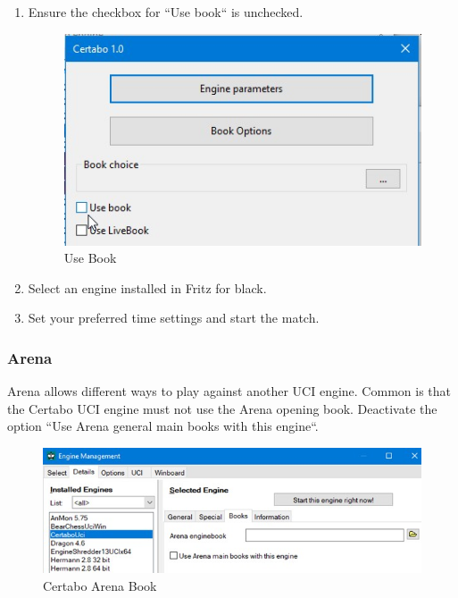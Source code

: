 \documentclass[11pt,a4paper]{article}
\begin{document}
\begin{enumerate}
	\item Ensure the checkbox for ``Use book`` is unchecked.
		\begin{figure}[H]
		\centering
		\includegraphics[scale=0.6]{fritz_engineusebook.jpg}
		\caption{Use Book}
		\label{fig:FritzUseBook}
	\end{figure}
	\item Select an engine installed in Fritz for black.
	\item Set your preferred time settings and start the match.	
\end{enumerate}

\subsubsection{Arena}
Arena allows different ways to play against another UCI engine. Common is that the Certabo UCI engine must not use the Arena opening book. Deactivate the option ``Use Arena general main books with this engine``.
		\begin{figure}[H]
	\centering
	\includegraphics[scale=0.6]{arena_mainbooks.jpg}
	\caption{Certabo Arena Book}
	\label{fig:ArenaUseBook}
\end{figure}
\end{document}
